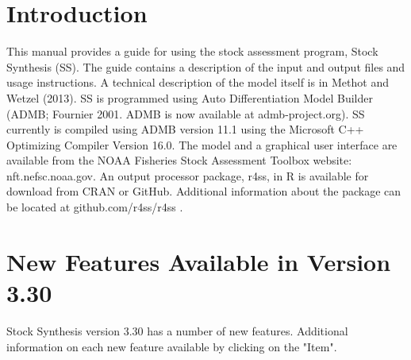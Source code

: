 
 \section{Introduction}\label{sec:intro}
	This manual provides a guide for using the stock assessment program, Stock Synthesis (SS).  The guide contains a description of the input and output files and usage instructions. A technical description of the model itself is in Methot and Wetzel (2013).  SS is programmed using Auto Differentiation Model Builder (ADMB; Fournier 2001.  ADMB is now available at admb-project.org).  SS currently is compiled using ADMB version 11.1 using the Microsoft C++ Optimizing Compiler Version 16.0.  The model and a graphical user interface are available from the NOAA Fisheries Stock Assessment Toolbox website: nft.nefsc.noaa.gov.  An output processor package, r4ss, in R is available for download from CRAN or GitHub.   Additional information about the package can be located at github.com/r4ss/r4ss .
	
\section{New Features Available in Version 3.30}
		Stock Synthesis version 3.30 has a number of new features. Additional information on each new feature available by clicking on the "Item".
		
